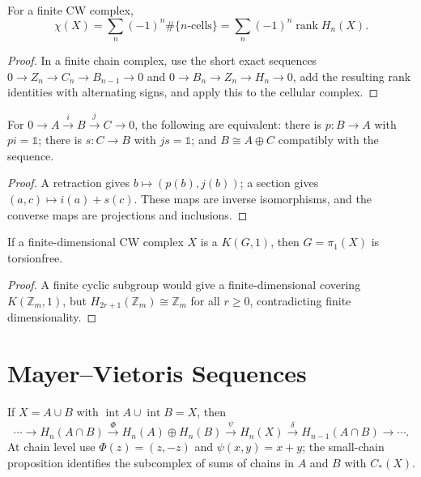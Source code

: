 \begin{theorem}
\label{thm:euler-characteristic-homology}
For a finite CW complex,
\[
\chi(X)=\sum_n(-1)^n\#\{n\text{-cells}\}=\sum_n(-1)^n\operatorname{rank}H_n(X).
\]
\end{theorem}
\begin{proof}
\sketch In a finite chain complex, use the short exact sequences $0\to Z_n\to C_n\to B_{n-1}\to0$ and $0\to B_n\to Z_n\to H_n\to0$, add the resulting rank identities with alternating signs, and apply this to the cellular complex.
\end{proof}

\begin{lemma}
\label{lem:splitting-lemma}
\uses{}
For $0\to A\xrightarrow{i}B\xrightarrow{j}C\to0$, the following are equivalent: there is $p:B\to A$ with $pi=\mathbb{1}$; there is $s:C\to B$ with $js=\mathbb{1}$; and $B\cong A\oplus C$ compatibly with the sequence.
\end{lemma}
\begin{proof}
\sketch A retraction gives $b\mapsto(p(b),j(b))$; a section gives $(a,c)\mapsto i(a)+s(c)$.  These maps are inverse isomorphisms, and the converse maps are projections and inclusions.
\end{proof}

\begin{proposition}
\label{prop:fundamental-group-kg1-torsionfree}
If a finite-dimensional CW complex $X$ is a $K(G,1)$, then $G=\pi_1(X)$ is torsionfree.
\end{proposition}
\begin{proof}
\sketch A finite cyclic subgroup would give a finite-dimensional covering $K(\mathbb{Z}_m,1)$, but $H_{2r+1}(\mathbb{Z}_m)\cong\mathbb{Z}_m$ for all $r\geq0$, contradicting finite dimensionality.
\end{proof}

\section*{Mayer--Vietoris Sequences}

If $X=A\cup B$ with $\operatorname{int}A\cup\operatorname{int}B=X$, then
\[
\cdots\to H_n(A\cap B)\xrightarrow{\Phi}H_n(A)\oplus H_n(B)\xrightarrow{\psi}H_n(X)\xrightarrow{\delta}H_{n-1}(A\cap B)\to\cdots.
\]
At chain level use $\Phi(z)=(z,-z)$ and $\psi(x,y)=x+y$; the small-chain proposition identifies the subcomplex of sums of chains in $A$ and $B$ with $C_*(X)$.

